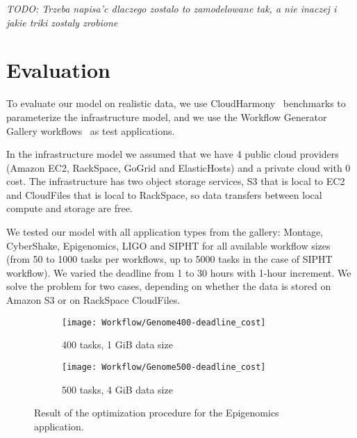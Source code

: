 {    \emph{TODO: Trzeba napisa'c dlaczego zostalo to zamodelowane tak, a nie inaczej i jakie triki zostaly zrobione}
    
    
    \section{Evaluation}
    \label{sec:evaluation}

    To evaluate our model on realistic data, we use CloudHarmony~\cite{CloudHarmony}
    benchmarks to parameterize the infrastructure model, and we use the Workflow
    Generator Gallery workflows~\cite{Bharathi08} as test applications.

    In the infrastructure model we assumed that we have 4 public cloud providers
    (Amazon EC2, RackSpace, GoGrid and ElasticHosts) and a private cloud with 0
    cost. The infrastructure has two object storage services, S3 that is local to EC2 and
    CloudFiles that is local to RackSpace, so data transfers between local compute
    and storage are free. 

    We tested our model with all application types from the gallery: Montage,
    CyberShake, Epigenomics, LIGO and SIPHT for all available workflow sizes
    (from 50 to 1000 tasks per workflows, up to 5000 tasks in the case of SIPHT
    workflow). We varied the deadline from 1 to 30 hours with 1-hour increment. We
    solve the problem for two cases, depending on whether the data is stored on Amazon S3 or
    on RackSpace CloudFiles.
  
    \begin{figure}[b] 
       \centering
       \begin{subfigure}[b]{0.49\textwidth}  
         \texttt{[image: Workflow/Genome400-deadline\_cost]}
         \caption{400 tasks, 1 GiB data size}
         \label{fig:genome-400}
       \end{subfigure}
       \begin{subfigure}[b]{0.49\textwidth}
         \texttt{[image: Workflow/Genome500-deadline\_cost]}
         \caption{500 tasks, 4 GiB data size}
         \label{fig:genome-500}
       \end{subfigure}
       \caption{\label{fig:genome}Result of the optimization procedure for the Epigenomics application.}
    \end{figure}  

}
